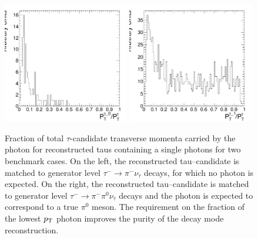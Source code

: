\begin{figure}[thbp]
  \setlength{\unitlength}{1mm}
  \begin{center}
    \includegraphics*[width=0.49\textwidth]{tanc_chapter/figures/decayModeMergerAndFilter/gammaPtFractionSinglePhotonForDM0.pdf}
    \includegraphics*[width=0.49\textwidth]{tanc_chapter/figures/decayModeMergerAndFilter/gammaPtFractionSinglePhotonForDM1.pdf}
    \caption[Neutral energy fraction in visible $\tau$ decays]{Fraction of total
    $\tau$-candidate transverse momenta carried by the photon for reconstructed
    taus containing a single photons for two benchmark cases.  On the left, the
    reconstructed tau--candidate is matched to generator level \mbox{$\tau^{-}
    \rightarrow \pi^{-}\nu_\tau$} decays, for which no photon is expected.  On
    the right, the reconstructed tau--candidate is matched to generator level
    \mbox{$\tau^{-} \rightarrow \pi^{-}\pi^0\nu_\tau$} decays and the photon is
    expected to correspond to a true $\pi^0$ meson.  The requirement on the
    \pt fraction of the lowest $p_{\mathrm{T}}$ photon improves the purity of the decay
    mode reconstruction.  } \label{fig:photonFiltering}
  \end{center}
\end{figure}

